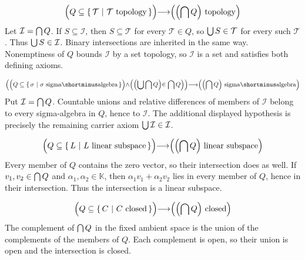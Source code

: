 \begin{theorem}
\begin{align*}
\left(
Q \subseteq \cc{\mathcal{T}}{\mathcal{T}\mathrm{\ topology}}
\middle)
\implies
\middle(
\middle(
\intersection Q
\middle)
\mathrm{\ topology}
\vphantom\union
\right)
\end{align*}
\Proof
Let $\mathcal{I}=\bigcap Q$. If $S\subseteq\mathcal{I}$,
then $S\subseteq\mathcal{T}$ for every $\mathcal{T}\in Q$, so
$\bigcup S\in\mathcal{T}$ for every such $\mathcal{T}$. Thus
$\bigcup S\in\mathcal{I}$. Binary intersections are inherited in the
same way. Nonemptiness of $Q$ bounds $\mathcal{I}$ by a set topology,
so $\mathcal{I}$ is a set and satisfies both defining axioms.
\DoneNoPar
\end{theorem}


\begin{theorem}
\begin{align*}
\left(
\middle(
Q \subseteq \cc{\sigma}{\sigma\mathrm{\ sigma{\shortminus}algebra}}
\middle)
\land
\middle(
\middle(
\union\intersection Q
\middle)
\in \intersection Q
\middle)
\middle)
\implies
\middle(
\middle(
\intersection Q
\middle)
\mathrm{\ sigma{\shortminus}algebra}
\vphantom\union
\right)
\end{align*}
\Proof
Put $\mathcal{I}=\bigcap Q$. Countable unions and relative
differences of members of $\mathcal{I}$ belong to every sigma-algebra
in $Q$, hence to $\mathcal{I}$. The additional displayed hypothesis
is precisely the remaining carrier axiom
$\bigcup\mathcal{I}\in\mathcal{I}$.
\DoneNoPar
\end{theorem}


\begin{theorem}
\begin{align*}
\left(
Q \subseteq \cc{L}{L\mathrm{\ linear\ subspace}}
\middle)
\implies
\middle(
\middle(
\intersection Q
\middle)
\mathrm{\ linear\ subspace}
\vphantom\union
\right)
\end{align*}
\Proof
Every member of $Q$ contains the zero vector, so their intersection
does as well. If $v_1,v_2\in\bigcap Q$ and
$\alpha_1,\alpha_2\in\mathbb{K}$, then
$\alpha_1v_1+\alpha_2v_2$ lies in every member of $Q$, hence in their
intersection. Thus the intersection is a linear subspace.
\DoneNoPar
\end{theorem}

\begin{theorem}
\begin{align*}
\left(
Q \subseteq \cc{C}{C\mathrm{\ closed}}
\middle)
\implies
\middle(
\middle(
\intersection Q
\middle)
\mathrm{\ closed}
\vphantom\union
\right)
\end{align*}
\Proof
The complement of $\bigcap Q$ in the fixed ambient space is
the union of the complements of the members of $Q$. Each complement
is open, so their union is open and the intersection is closed.
\DoneNoPar
\end{theorem}

